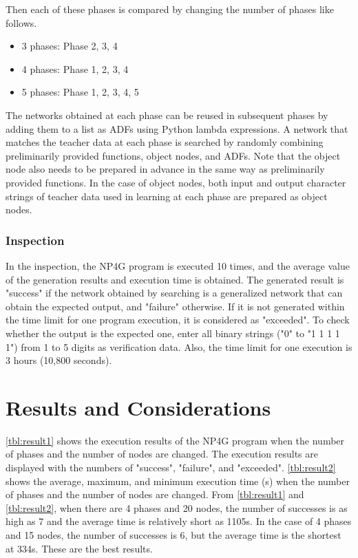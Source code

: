 \documentclass{article}
\begin{document}
Then each of these phases is compared by changing the number of phases like follows.
\begin{itemize}
\item 3 phases:
Phase 2, 3, 4
\item 4 phases:
Phase 1, 2, 3, 4
\item 5 phases:
Phase 1, 2, 3, 4, 5
\end{itemize}
\noindent


The networks obtained at each phase can be reused in subsequent phases by adding them to a list as ADFs using Python lambda expressions.
A network that matches the teacher data at each phase is searched by randomly combining preliminarily provided functions, object nodes, and ADFs.
Note that the object node also needs to be prepared in advance in the same way as preliminarily provided functions.
In the case of object nodes, both input and output character strings of teacher data used in learning at each phase are prepared as object nodes.

\subsubsection {Inspection}
In the inspection, the NP4G program is executed 10 times, and the average value of the generation results and execution time is obtained.
The generated result is "success" if the network obtained by searching is a generalized network that can obtain the expected output, and "failure" otherwise. If it is not generated within the time limit for one program execution, it is considered as "exceeded".
To check whether the output is the expected one, enter all binary strings ("0" to "1 1 1 1 1") from 1 to 5 digits as verification data.
Also, the time limit for one execution is 3 hours (10,800 seconds).

\section {Results and Considerations}
\ref{tbl:result1} shows the execution results of the NP4G program when the number of phases and the number of nodes are changed.
The execution results are displayed with the numbers of "success", "failure", and "exceeded".
\ref{tbl:result2} shows the average, maximum, and minimum execution time (s) when the number of phases and the number of nodes are changed.
From \ref{tbl:result1} and \ref{tbl:result2}, when there are 4 phases and 20 nodes, the number of successes is as high as 7 and the average time is relatively short as 1105s.
In the case of 4 phases and 15 nodes, the number of successes is 6, but the average time is the shortest at 334s.
These are the best results.
\end{document}

